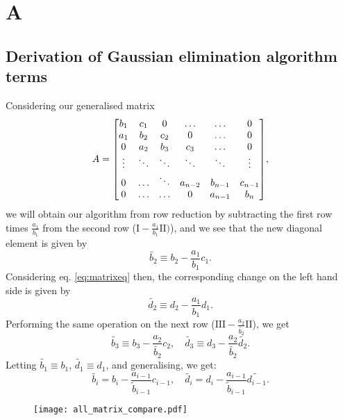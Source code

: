 \onecolumn
\section*{A}
\label{sec:appendix}
\renewcommand{\theequation}{\thesection .\arabic{equation}}

\subsection*{Derivation of Gaussian elimination algorithm terms}
\label{sec:derivgauss}
Considering our generalised matrix
  \[A =
    \mqty[b_1 & c_1 & 0 & \hdots & \hdots & 0 \\
          a_1 & b_2 & c_2 & 0 & \hdots & 0 \\
          0 & a_2 & b_3 & c_3 & \hdots & 0 \\
          \vdots & \ddots & \ddots & \ddots & \ddots & \vdots \\
          0 & \hdots & \ddots & a_{n-2} & b_{n-1} & c_{n-1} \\
          0 & \hdots & \hdots & 0 & a_{n-1} & b_n],
  \]
we will obtain our algorithm from row reduction by subtracting the first row
times $\frac{a_1}{b_1}$ from the second row ($\text{I} - \frac{a_1}{b_1}\text{II}
)$), and we see that the new diagonal element is given by
  \[\widetilde{b_2} \equiv b_2 - \frac{a_1}{b_1}c_1.\]
Considering eq. \ref{eq:matrixeq} then, the corresponding change on the left
hand side is given by
  \[\widetilde{d_2} \equiv d_2 - \frac{a_1}{b_1}d_1.\]
Performing the same operation on the next row
($\text{III} - \frac{a_2}{\widetilde{b_2}}\text{II}$), we get
  \[\widetilde{b_3} \equiv b_3 - \frac{a_2}{\widetilde{b_2}}c_2, \quad
  \widetilde{d_3} \equiv d_3 - \frac{a_2}{\widetilde{b_2}}\widetilde{d_2}.
  \]
Letting $\widetilde{b_1} \equiv b_1$, $\widetilde{d_1} \equiv d_1$, and
generalising, we get:
  \begin{equation}
    \widetilde{b_i} = b_i - \frac{a_{i-1}}{\widetilde{b}_{i-1}}c_{i-1}, \quad
    \widetilde{d_i} = d_i - \frac{a_{i-1}}{\widetilde{b}_{i-1}}\widetilde{d_{i-1}}.
  \end{equation}

\begin{figure}[htbp]
	\centering
	\texttt{[image: all\_matrix\_compare.pdf]}
	\caption{}
	\label{fig:all}
\end{figure}